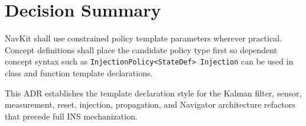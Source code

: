 \documentclass[11pt]{article}
\begin{document}
\section{Decision Summary}

NavKit shall use constrained policy template parameters wherever practical.
Concept definitions shall place the candidate policy type first so dependent
concept syntax such as \texttt{InjectionPolicy<StateDef> Injection} can be used
in class and function template declarations.

This ADR establishes the template declaration style for the Kalman filter,
sensor, measurement, reset, injection, propagation, and Navigator architecture
refactors that precede full INS mechanization.
\end{document}
